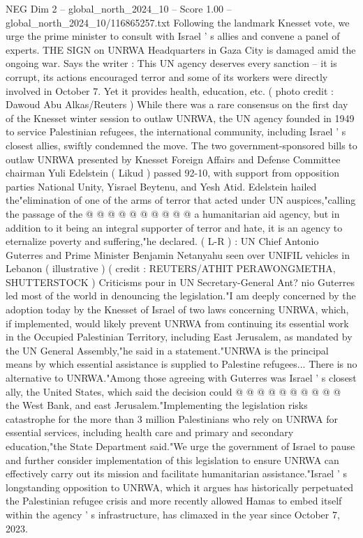 \begin{textsample}{NEG Dim 2 – global\_north\_2024\_10 – Score 1.00 – global\_north\_2024\_10/116865257.txt}  \label{ex:f2_neg_372}
Following the landmark Knesset vote, we urge the prime minister to consult with Israel ' s allies and convene a panel of experts.
THE SIGN on UNRWA Headquarters in Gaza City is damaged amid the ongoing war.
Says the writer : This UN agency deserves every sanction -- it is corrupt, its actions encouraged terror and some of its workers were directly involved in October 7.
Yet it provides health, education, etc. ( photo credit : Dawoud Abu Alkas/Reuters ) While there was a rare consensus on the first day of the Knesset winter session to outlaw UNRWA, the UN agency founded in 1949 to service Palestinian refugees, the international community, including Israel ' s closest allies, swiftly condemned the move.
The two government-sponsored bills to outlaw UNRWA presented by Knesset Foreign Affairs and Defense Committee chairman Yuli Edelstein ( Likud ) passed 92-10, with support from opposition parties National Unity, Yisrael Beytenu, and Yesh Atid.
Edelstein hailed the"elimination of one of the arms of terror that acted under UN auspices,"calling the passage of the @ @ @ @ @ @ @ @ @ @ a humanitarian aid agency, but in addition to it being an integral supporter of terror and hate, it is an agency to eternalize poverty and suffering,"he declared. ( L-R ) : UN Chief Antonio Guterres and Prime Minister Benjamin Netanyahu seen over UNIFIL vehicles in Lebanon ( illustrative ) ( credit : REUTERS/ATHIT PERAWONGMETHA, SHUTTERSTOCK ) Criticisms pour in UN Secretary-General Ant? nio Guterres led most of the world in denouncing the legislation."I am deeply concerned by the adoption today by the Knesset of Israel of two laws concerning UNRWA, which, if implemented, would likely prevent UNRWA from continuing its essential work in the Occupied Palestinian Territory, including East Jerusalem, as mandated by the UN General Assembly,"he said in a statement."UNRWA is the principal means by which essential assistance is supplied to Palestine refugees...
There is no alternative to UNRWA."Among those agreeing with Guterres was Israel ' s closest ally, the United States, which said the decision could @ @ @ @ @ @ @ @ @ @ the West Bank, and east Jerusalem."Implementing the legislation risks catastrophe for the more than 3 million Palestinians who rely on UNRWA for essential services, including health care and primary and secondary education,"the State Department said."We urge the government of Israel to pause and further consider implementation of this legislation to ensure UNRWA can effectively carry out its mission and facilitate humanitarian assistance."Israel ' s longstanding opposition to UNRWA, which it argues has historically perpetuated the Palestinian refugee crisis and more recently allowed Hamas to embed itself within the agency ' s infrastructure, has climaxed in the year since October 7, 2023.

\end{textsample}
